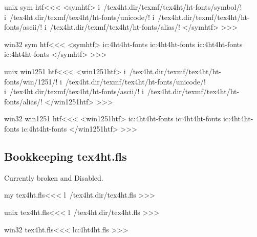 \documentclass{article}
\begin{document}
\<unix sym htf\><<<                                                      %
<symhtf>
i~/tex4ht.dir/texmf/tex4ht/ht-fonts/symbol/!
i~/tex4ht.dir/texmf/tex4ht/ht-fonts/unicode/!
i~/tex4ht.dir/texmf/tex4ht/ht-fonts/ascii/!
i~/tex4ht.dir/texmf/tex4ht/ht-fonts/alias/!
</symhtf>
>>>

\<win32 sym htf\><<<                                                     %
<symhtf>
ic:\tex4ht\texmf\tex4ht\ht-fonts\symbol\!
ic:\tex4ht\texmf\tex4ht\ht-fonts\unicode\!
ic:\tex4ht\texmf\tex4ht\ht-fonts\ascii\!
ic:\tex4ht\texmf\tex4ht\ht-fonts\alias\!
</symhtf>
>>>




\<unix win1251 htf\><<<                                                      %
<win1251htf>
i~/tex4ht.dir/texmf/tex4ht/ht-fonts/win/1251/!
i~/tex4ht.dir/texmf/tex4ht/ht-fonts/unicode/!
i~/tex4ht.dir/texmf/tex4ht/ht-fonts/ascii/!
i~/tex4ht.dir/texmf/tex4ht/ht-fonts/alias/!
</win1251htf>
>>>

\<win32 win1251 htf\><<<                                                     %
<win1251htf>
ic:\tex4ht\texmf\tex4ht\ht-fonts\win{}\!
ic:\tex4ht\texmf\tex4ht\ht-fonts\unicode\!
ic:\tex4ht\texmf\tex4ht\ht-fonts\ascii\!
ic:\tex4ht\texmf\tex4ht\ht-fonts\alias\!
</win1251htf>
>>>





\subsection{Bookkeeping tex4ht.fls}

Currently broken and Disabled.


\<my tex4ht.fls\><<<
l~/tex4ht.dir/tex4ht.fls
>>>




\<unix tex4ht.fls\><<<
 l~/tex4ht.dir/tex4ht.fls
>>>



\<win32 tex4ht.fls\><<<
lc:\tex4ht\tex4ht.fls
>>>
\end{document}
